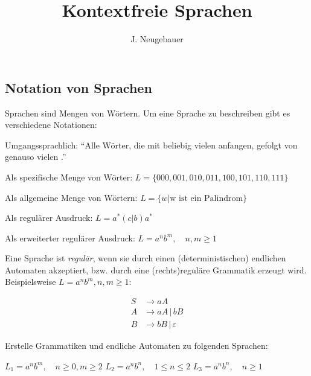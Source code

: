 \documentclass[10pt, a4paper]{scrartcl}
\author{J. Neugebauer}
\title{Kontextfreie Sprachen}
\date{\Heute}
\begin{document}
\ReiheTitel

\begin{infobox}
\subsection*{Notation von Sprachen}
Sprachen sind Mengen von Wörtern. Um eine Sprache zu beschreiben gibt es verschiedene Notationen:
\begin{smallitemize}
	\item Umgangssprachlich: \enquote{Alle Wörter, die mit beliebig vielen  anfangen, gefolgt von genauso vielen .}
	\item Als spezifische Menge von Wörter: $L = \{ 000, 001, 010, 011, 100, 101, 110, 111 \}$
	\item Als allgemeine Menge von Wörtern: $L = \{ w | \text{w ist ein Palindrom} \}$
	\item Als regulärer Ausdruck: $L = a^{*}(c|b)a^{*}$
	\item Als erweiterter regulärer Ausdruck: $L = a^nb^m, \quad n,m \geq 1$
\end{smallitemize}
\end{infobox}

Eine Sprache ist \emph{regulär}, wenn sie durch einen (deterministischen) endlichen Automaten akzeptiert, bzw. durch eine (rechts)reguläre Grammatik erzeugt wird. Beispielsweise $L=a^nb^m, n,m \geq 1$:
\begin{figure}[h]
	\begin{subfigure}{.5\textwidth}
		\begin{transitiongraph}[fa]
		\end{transitiongraph}
	\end{subfigure}%
	\begin{subfigure}{.5\textwidth}
		\begin{align*}
		S &\rightarrow a A \\
		A &\rightarrow a A \,|\, b B \\
		B &\rightarrow b B \,|\, \varepsilon
		\end{align*}
	\end{subfigure}
\end{figure}

\begin{aufgabe}
\label{aufg:grammatiken-erstellen}
Erstelle Grammatiken und endliche Automaten zu folgenden Sprachen:
\begin{teilaufgaben}
	\teilaufgabe $L_1 = a^nb^m, \quad n\geq 0, m \geq 2$
	\teilaufgabe $L_2 = a^nb^n, \quad 1\leq n \leq 2$
	\teilaufgabe $L_3 = a^nb^n, \quad n \geq 1$
\end{teilaufgaben}
\end{aufgabe}
\end{document}

